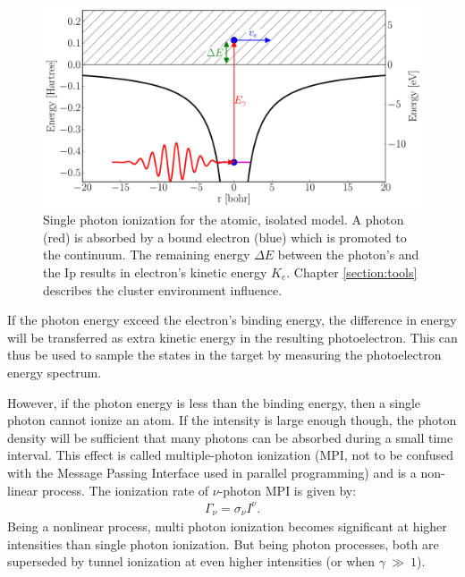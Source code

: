 \begin{figure}
 \centering
 \includegraphics[width=\figurewidth]{figures/ionization_single}
 \caption{Single photon ionization for the atomic, isolated model. A photon
          (red) is absorbed by a bound electron (blue) which is promoted to
          the continuum. The remaining energy $\Delta E$ between the photon's
          and the Ip results in electron's kinetic energy $K_e$.
          Chapter \ref{section:tools} describes the cluster environment
          influence.}
 \label{fig:ionization:single}
\end{figure}

If the photon energy exceed the electron's binding energy, the difference in energy
will be transferred as extra kinetic energy in the
resulting photoelectron. This can thus be used to sample the states in the
target by measuring the photoelectron energy spectrum\cite{Fennel2010}.

However, if the photon energy is less than the binding energy, then a single
photon cannot ionize an atom. If the intensity is large enough though, the
photon density will be sufficient that many photons can be absorbed during a
small time interval.
This effect is called multiple-photon ionization (MPI, not to
be confused with the Message Passing Interface used in parallel programming) and
is a non-linear process. The ionization rate of $\nu$-photon MPI is given
by\cite{Fennel2010}:
\begin{align}
\Gamma_{\nu} = \sigma_{\nu} I^{\nu}.
\label{eqn:ionization:rate:mpi}
\end{align}
Being a nonlinear process, multi photon ionization becomes significant at higher
intensities than single photon ionization. But being photon processes, both are
superseded by tunnel ionization at even higher intensities (or when
$\gamma~\gg~1$).


{}

